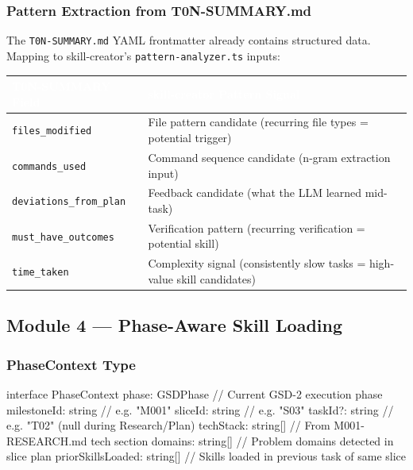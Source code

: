 \documentclass[11pt,letterpaper]{article}
\newcommand{\tableheader}[1]{\textbf{\sffamily\textcolor{white}{#1}}}
\begin{document}
\subsubsection{Pattern Extraction from T0N-SUMMARY.md}

The \texttt{T0N-SUMMARY.md} YAML frontmatter already contains structured data. Mapping to skill-creator's \texttt{pattern-analyzer.ts} inputs:

\begin{center}
\begin{tabularx}{\textwidth}{L{3.5cm}X}
\toprule
{}
\tableheader{T0N-SUMMARY Field} & \tableheader{skill-creator Pattern Signal} \\
\midrule
\texttt{files\_modified} & File pattern candidate (recurring file types = potential trigger) \\
\texttt{commands\_used} & Command sequence candidate (n-gram extraction input) \\
\texttt{deviations\_from\_plan} & Feedback candidate (what the LLM learned mid-task) \\
\texttt{must\_have\_outcomes} & Verification pattern (recurring verification = potential skill) \\
\texttt{time\_taken} & Complexity signal (consistently slow tasks = high-value skill candidates) \\
\bottomrule
\end{tabularx}
\end{center}

\subsection{Module 4 --- Phase-Aware Skill Loading}

\subsubsection{PhaseContext Type}

\begin{asciibox}
interface PhaseContext {
  phase: GSDPhase              // Current GSD-2 execution phase
  milestoneId: string          // e.g. "M001"
  sliceId: string              // e.g. "S03"
  taskId?: string              // e.g. "T02" (null during Research/Plan)
  techStack: string[]          // From M001-RESEARCH.md tech section
  domains: string[]            // Problem domains detected in slice plan
  priorSkillsLoaded: string[]  // Skills loaded in previous task of same slice
}
\end{asciibox}
\end{document}
